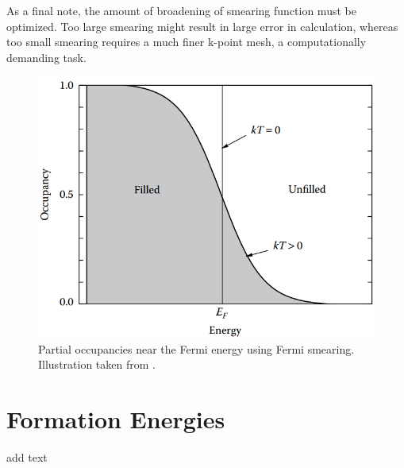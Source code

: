 As a final note, the amount of broadening of smearing function must be optimized. Too large smearing might result in large error in calculation, whereas too small smearing requires a much finer k-point mesh, a computationally demanding task. 
\begin{figure}[h!]
    \centering
    \includegraphics[width=0.45\linewidth]{"images/computational/occupancy"}
    \caption[ Partial occupancies near the Fermi energy using Fermi smearing ]{Partial occupancies near the Fermi energy using Fermi smearing. Illustration taken from \citep{Lee2016}.}
    \label{fig:occupancy}
\end{figure}

\section{Formation Energies}
add text






